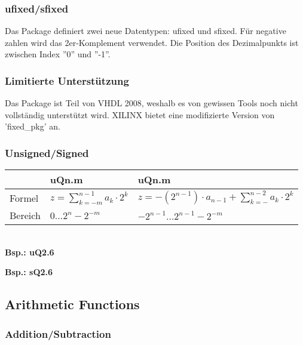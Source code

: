 \subsubsection{ufixed/sfixed}
Das Package definiert zwei neue Datentypen: ufixed und sfixed. Für negative zahlen wird das 2er-Komplement verwendet. Die Position des Dezimalpunkts ist zwischen Index ''0'' und ''-1''.


\subsubsection{Limitierte Unterstützung}
Das Package ist Teil von VHDL 2008, weshalb es von gewissen Tools noch nicht vollständig unterstützt wird. XILINX bietet eine modifizierte Version von 'fixed\_pkg' an.
% 

\subsubsection{Unsigned/Signed}
\begin{tabular}{| l | l | l |}
\hline
&  uQn.m & uQn.m\\
\hline
Formel & $z=\sum_{k=-m}^{n-1}a_k \cdot 2^k$ & $z=-(2^{n-1}) \cdot a_{n-1} + \sum_{k=-}^{n-2}a_k \cdot 2^k$\\
\hline
Bereich & $0 \ldots 2^n-2^{-m}$ & $-2^{n-1} \ldots 2^{n-1}-2^{-m}$\\
\hline
\end{tabular}\\
\textbf{Bsp.: uQ2.6}

\textbf{Bsp.: sQ2.6}


\subsection{Arithmetic Functions}
\subsubsection{Addition/Subtraction}
